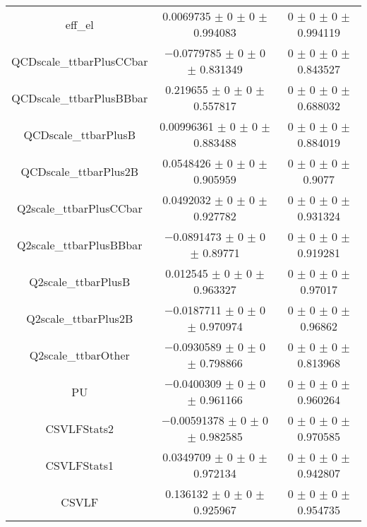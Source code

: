 \begin{table}
\begin{tabular}{ccc}
eff\_el 	& \num{0.0069735} $\pm$ \num{0} $\pm$ \num{0} $\pm$ \num{0.994083} 	& \num{0} $\pm$ \num{0} $\pm$ \num{0} $\pm$ \num{0.994119}\\
QCDscale\_ttbarPlusCCbar 	& \num{-0.0779785} $\pm$ \num{0} $\pm$ \num{0} $\pm$ \num{0.831349} 	& \num{0} $\pm$ \num{0} $\pm$ \num{0} $\pm$ \num{0.843527}\\
QCDscale\_ttbarPlusBBbar 	& \num{0.219655} $\pm$ \num{0} $\pm$ \num{0} $\pm$ \num{0.557817} 	& \num{0} $\pm$ \num{0} $\pm$ \num{0} $\pm$ \num{0.688032}\\
QCDscale\_ttbarPlusB 	& \num{0.00996361} $\pm$ \num{0} $\pm$ \num{0} $\pm$ \num{0.883488} 	& \num{0} $\pm$ \num{0} $\pm$ \num{0} $\pm$ \num{0.884019}\\
QCDscale\_ttbarPlus2B 	& \num{0.0548426} $\pm$ \num{0} $\pm$ \num{0} $\pm$ \num{0.905959} 	& \num{0} $\pm$ \num{0} $\pm$ \num{0} $\pm$ \num{0.9077}\\
Q2scale\_ttbarPlusCCbar 	& \num{0.0492032} $\pm$ \num{0} $\pm$ \num{0} $\pm$ \num{0.927782} 	& \num{0} $\pm$ \num{0} $\pm$ \num{0} $\pm$ \num{0.931324}\\
Q2scale\_ttbarPlusBBbar 	& \num{-0.0891473} $\pm$ \num{0} $\pm$ \num{0} $\pm$ \num{0.89771} 	& \num{0} $\pm$ \num{0} $\pm$ \num{0} $\pm$ \num{0.919281}\\
Q2scale\_ttbarPlusB 	& \num{0.012545} $\pm$ \num{0} $\pm$ \num{0} $\pm$ \num{0.963327} 	& \num{0} $\pm$ \num{0} $\pm$ \num{0} $\pm$ \num{0.97017}\\
Q2scale\_ttbarPlus2B 	& \num{-0.0187711} $\pm$ \num{0} $\pm$ \num{0} $\pm$ \num{0.970974} 	& \num{0} $\pm$ \num{0} $\pm$ \num{0} $\pm$ \num{0.96862}\\
Q2scale\_ttbarOther 	& \num{-0.0930589} $\pm$ \num{0} $\pm$ \num{0} $\pm$ \num{0.798866} 	& \num{0} $\pm$ \num{0} $\pm$ \num{0} $\pm$ \num{0.813968}\\
PU 	& \num{-0.0400309} $\pm$ \num{0} $\pm$ \num{0} $\pm$ \num{0.961166} 	& \num{0} $\pm$ \num{0} $\pm$ \num{0} $\pm$ \num{0.960264}\\
CSVLFStats2 	& \num{-0.00591378} $\pm$ \num{0} $\pm$ \num{0} $\pm$ \num{0.982585} 	& \num{0} $\pm$ \num{0} $\pm$ \num{0} $\pm$ \num{0.970585}\\
CSVLFStats1 	& \num{0.0349709} $\pm$ \num{0} $\pm$ \num{0} $\pm$ \num{0.972134} 	& \num{0} $\pm$ \num{0} $\pm$ \num{0} $\pm$ \num{0.942807}\\
CSVLF 	& \num{0.136132} $\pm$ \num{0} $\pm$ \num{0} $\pm$ \num{0.925967} 	& \num{0} $\pm$ \num{0} $\pm$ \num{0} $\pm$ \num{0.954735}\\

\end{tabular}
\end{table}
